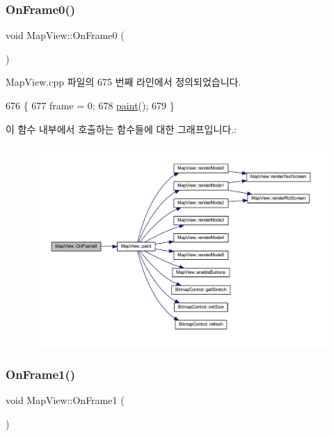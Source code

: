 \subsubsection{\texorpdfstring{On\+Frame0()}{OnFrame0()}}
{\footnotesize\ttfamily void Map\+View\+::\+On\+Frame0 (\begin{DoxyParamCaption}{ }\end{DoxyParamCaption})\hspace{0.3cm}{\ttfamily [protected]}}



Map\+View.\+cpp 파일의 675 번째 라인에서 정의되었습니다.


\begin{DoxyCode}
676 \{
677   frame = 0;
678   \mbox{\hyperlink{class_map_view_a89edf3053cffa4a68516178dbd987339}{paint}}();  
679 \}
\end{DoxyCode}
이 함수 내부에서 호출하는 함수들에 대한 그래프입니다.\+:
\nopagebreak
\begin{figure}[H]
\begin{center}
\leavevmode
\includegraphics[width=350pt]{class_map_view_a40f869c5b6d3c5b93d46a0b0167cdbd8_cgraph}
\end{center}
\end{figure}
\mbox{\label{class_map_view_ad8ca5cae3a97cb68c733a993317ce695}} 
\subsubsection{\texorpdfstring{On\+Frame1()}{OnFrame1()}}
{\footnotesize\ttfamily void Map\+View\+::\+On\+Frame1 (\begin{DoxyParamCaption}{ }\end{DoxyParamCaption})\hspace{0.3cm}{\ttfamily [protected]}}



